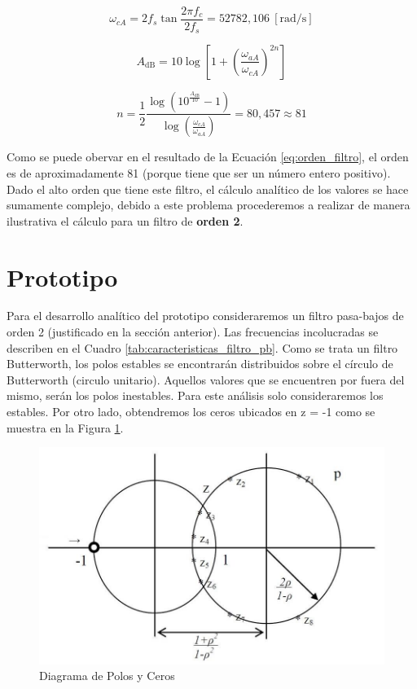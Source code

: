 \begin{equation}
  \omega_{cA} = 2 f_s \tan \frac{2\pi f_c}{2f_s} = 52782,106\ \mathrm{[rad / s]}
  \label{eq:omega_c}
\end{equation}

\begin{equation}
  A_\mathrm{dB} = 10 \log \left[1 + \left(\frac{\omega_{aA}}{\omega_{cA}}\right)^{2n}\right]
  \label{eq:atenuacion_db}
\end{equation}

\begin{equation}
  n = \frac{1}{2} \frac{\log \left(10^{\frac{A_{\mathrm{dB}}}{10}}-1 \right)}{\log \left( \frac{\omega_{cA}}{\omega_{aA}} \right)} = 80,457 \approx 81
  \label{eq:orden_filtro}
\end{equation}

Como se puede obervar en el resultado de la Ecuación \ref{eq:orden_filtro}, el orden es de aproximadamente 81 (porque tiene que ser un número entero positivo). Dado el alto orden que tiene este filtro, el cálculo analítico de los valores se hace sumamente complejo, debido a este problema procederemos a realizar de manera ilustrativa el cálculo para un filtro de \textbf{orden 2}.

\section{Prototipo}
Para el desarrollo analítico del prototipo consideraremos un filtro pasa-bajos de orden 2 (justificado en la sección anterior). Las frecuencias incolucradas se describen en el Cuadro \ref{tab:caracteristicas_filtro_pb}. Como se trata un filtro Butterworth, los polos estables se encontrarán distribuidos sobre el círculo de Butterworth (circulo unitario). Aquellos valores que se encuentren por fuera del mismo, serán los polos inestables. Para este análisis solo consideraremos los estables. Por otro lado, obtendremos los ceros
ubicados en z = -1 como se muestra en la Figura \ref{fig:circulo_butterworth}.

\begin{figure}[ht]
  \centering
  \includegraphics[width=400pt]{images/circulo_butterworth.png}
  \caption{Diagrama de Polos y Ceros}
  \label{fig:circulo_butterworth}
\end{figure}


